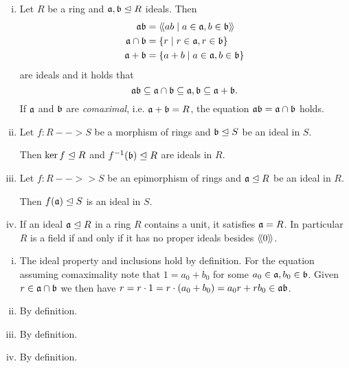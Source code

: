 	\begin{lemma}
		\vspace{-1.5em}\begin{enumerate}[(i)]
			\item{
				Let $R$ be a ring and $\mathfrak{a},\mathfrak{b} \trianglelefteq R$ ideals. Then
				\begin{align*}
					\mathfrak{ab} &= \langle\!\langle ab \mid a \in \mathfrak{a}, b \in \mathfrak{b} \rangle\!\rangle\\
					\mathfrak{a} \cap \mathfrak{b} &= \{r \mid r \in \mathfrak{a}, r \in \mathfrak{b}\}\\
					\mathfrak{a} + \mathfrak{b} &= \{a + b \mid a \in \mathfrak{a}, b \in \mathfrak{b}\}
				\end{align*}
				are ideals and it holds that 
				\begin{equation*}
					\mathfrak{ab} \subseteq \mathfrak{a} \cap \mathfrak{b} \subseteq \mathfrak{a}, \mathfrak{b} \subseteq \mathfrak{a} + \mathfrak{b}.
				\end{equation*}
				If $\mathfrak{a}$ and $\mathfrak{b}$ are \textit{comaximal}, i.e. $\mathfrak{a} + \mathfrak{b} = R$, the equation $\mathfrak{ab} = \mathfrak{a} \cap \mathfrak{b}$ holds.
			}
			\item{
				Let $f:R --> S$ be a morphism of rings and $\mathfrak{b} \trianglelefteq S$ be an ideal in $S$.

				Then $\ker f \trianglelefteq R$ and $f^{-1}(\mathfrak{b}) \trianglelefteq R$ are ideals in $R$.
			}
			\item{
				Let $f:R -->> S$ be an epimorphism of rings and $\mathfrak{a} \trianglelefteq R$ be an ideal in $R$.

				Then $f(\mathfrak{a}) \trianglelefteq S$ is an ideal in $S$.
			}
			\item{
				If an ideal $\mathfrak{a} \trianglelefteq R$ in a ring $R$ contains a unit, it satisfies $\mathfrak{a}=R$. In particular $R$ is a field if and only if it has no proper ideals besides $\langle\!\langle 0 \rangle\!\rangle$.
			}
		\end{enumerate}
	\end{lemma}
	\begin{sketch}
		\begin{enumerate}[(i)]
			\item{
				The ideal property and inclusions hold by definition. For the equation assuming comaximality note that $1 = a_0+b_0$ for some $a_0 \in \mathfrak{a}, b_0 \in \mathfrak{b}$. Given $r \in \mathfrak{a}\cap\mathfrak{b}$ we then have $r = r\cdot 1 = r\cdot(a_0+b_0) = a_0r + rb_0 \in \mathfrak{ab}$.
			}
			\item{
				By definition.
			}
			\item{
				By definition.
			}
			\item{
				By definition.
			}
		\end{enumerate}\vspace{-2em}
	\end{sketch}

